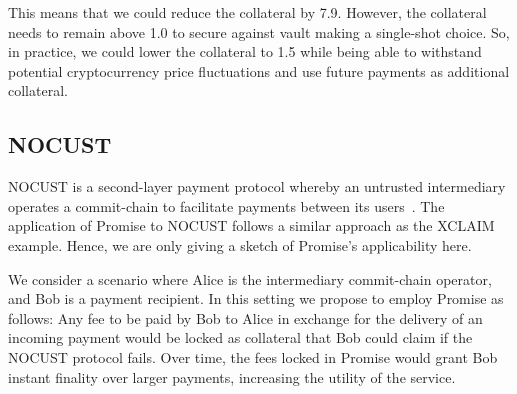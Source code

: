 \documentclass[runningheads]{llncs}
\newcommand{\sys}{Promise\xspace}
\newcommand{\dom}[1]{\todo[linecolor=green,backgroundcolor=green!25,bordercolor=green,inline,caption={}]{Comment by Dominik: #1}}
\begin{document}
This means that we could reduce the collateral by 7.9.
However, the collateral needs to remain above 1.0 to secure against vault making a single-shot choice.
So, in practice, we could lower the collateral to 1.5 while being able to withstand potential cryptocurrency price fluctuations and use future payments as additional collateral.


\subsection{NOCUST}

NOCUST is a second-layer payment protocol whereby an untrusted intermediary operates a commit-chain to facilitate payments between its users~\cite{Khalil2019NOCUST}.
The application of \sys to NOCUST follows a similar approach as the XCLAIM example.
Hence, we are only giving a sketch of \sys's applicability here.

We consider a scenario where Alice is the intermediary commit-chain operator, and Bob is a payment recipient. In this setting we propose to employ \sys as follows: Any fee to be paid by Bob to Alice in exchange for the delivery of an incoming payment would be locked as collateral that Bob could claim if the NOCUST protocol fails. Over time, the fees locked in \sys would grant Bob instant finality over larger payments, increasing the utility of the service.

\end{document}
